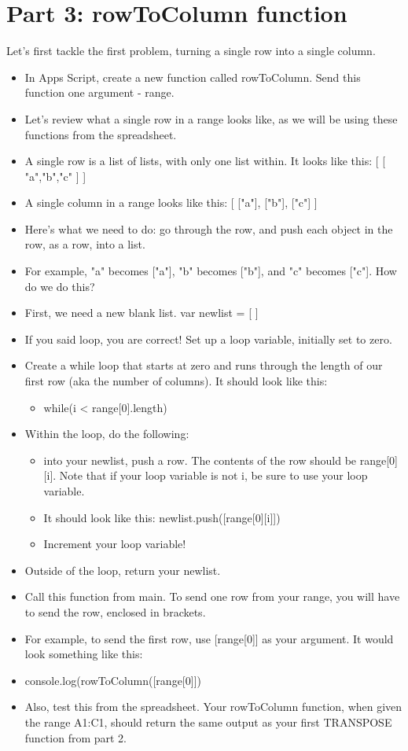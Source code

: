 \documentclass{article}
\begin{document}
\section*{Part 3: rowToColumn function}
Let's first tackle the first problem, turning a single row into a single column.
\begin{itemize}
    \item In Apps Script, create a new function called rowToColumn.  Send this function one argument - range.
    \item Let's review what a single row in a range looks like, as we will be using these functions from the spreadsheet.
    \item A single row is a list of lists, with only one list within.  It looks like this:  [ [ "a","b","c" ] ]
    \item A single column in a range looks like this:  [ ["a"], ["b"], ["c"] ]
    \item Here's what we need to do:  go through the row, and push each object in the row, as a row, into a list.
    \item For example, "a" becomes ["a"], "b" becomes ["b"], and "c" becomes ["c"].  How do we do this?
    \item First, we need a new blank list.  var newlist = [ ]
    \item If you said loop, you are correct!  Set up a loop variable, initially set to zero.
    \item Create a while loop that starts at zero and runs through the length of our first row (aka the number of columns).  It should look like this:
    \begin{itemize}
    		\item while(i < range[0].length)
    	\end{itemize}
    	\item Within the loop, do the following:
    	\begin{itemize}
    		\item into your newlist, push a row.  The contents of the row should be range[0][i].  Note that if your loop variable is not i, be sure to use your loop variable.
    		\item It should look like this:  newlist.push([range[0][i]])
    		\item Increment your loop variable!
    	\end{itemize}
    	\item Outside of the loop, return your newlist.  
    	\item Call this function from main.  To send one row from your range, you will have to send the row, enclosed in brackets.
    	\item For example, to send the first row, use [range[0]] as your argument.  It would look something like this:
    	\item console.log(rowToColumn([range[0]])
    	\item Also, test this from the spreadsheet.  Your rowToColumn function, when given the range A1:C1, should return the same output as your first TRANSPOSE function from part 2.
\end{itemize}
\end{document}
